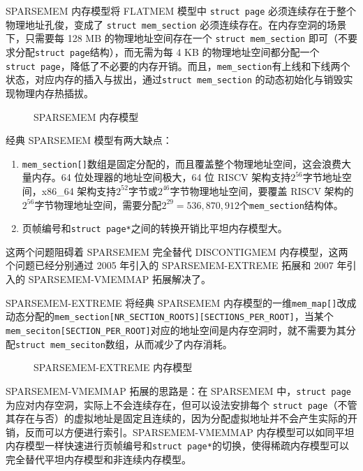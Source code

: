\documentclass[AutoFakeBold]{LZUThesis}
\begin{document}
\begin{sloppypar}
SPARSEMEM 内存模型将 FLATMEM 模型中 \texttt{struct\ page}
必须连续存在于整个物理地址孔俊，变成了 \texttt{struct\ mem\_section}
必须连续存在。在内存空洞的场景下，只需要每 128 MB 的物理地址空间存在一个
\texttt{struct\ mem\_section} 即可（不要求分配\texttt{struct\ page}结构），而无需为每 4 KB 的物理地址空间都分配一个\texttt{struct\ page}，降低了不必要的内存开销。而且，\texttt{mem\_section}有上线和下线两个状态，对应内存的插入与拔出，通过\texttt{struct\ mem\_section} 的动态初始化与销毁实现物理内存热插拔。

\begin{figure}[htb]
\centering

\caption{SPARSEMEM 内存模型}
\end{figure}

经典 SPARSEMEM 模型有两大缺点：

\begin{enumerate}
\def\labelenumi{\arabic{enumi}.}
\item
  \texttt{mem\_section{[}{]}}数组是固定分配的，而且覆盖整个物理地址空间，这会浪费大量内存。64
  位处理器的地址空间极大，64 位 RISCV
  架构支持\(2^{56}\)字节地址空间，x86\_64
  架构支持\(2^{52}\)字节或\(2^{46}\)字节物理地址空间，要覆盖 RISCV
  架构的\(2^{56}\)字节物理地址空间，需要分配\(2^{29} = 536,870,912\)个\texttt{mem\_section}结构体。
\item
  页帧编号和\texttt{struct\ page*}之间的转换开销比平坦内存模型大。
\end{enumerate}

这两个问题阻碍着 SPARSEMEM 完全替代 DISCONTIGMEM
内存模型，这两个问题已经分别通过 2005 年引入的 SPARSEMEM-EXTREME 拓展和
2007 年引入的 SPARSEMEM-VMEMMAP 拓展解决了。

SPARSEMEM-EXTREME 将经典 SPARSEMEM
内存模型的一维\texttt{mem\_map{[}{]}}改成动态分配的\texttt{mem\_section{[}NR\_SECTION\_ROOTS{]}{[}SECTIONS\_PER\_ROOT{]}}，当某个\texttt{mem\_seciton{[}SECTION\_PER\_ROOT{]}}对应的地址空间是内存空洞时，就不需要为其分配\texttt{struct\ mem\_seciton}数组，从而减少了内存消耗。

\begin{figure}[H]
\centering

\caption{SPARSEMEM-EXTREME 内存模型}
\end{figure}

SPARSEMEM-VMEMMAP 拓展的思路是：在 SPARSEMEM 中，\texttt{struct\ page}
为应对内存空洞，实际上不会连续存在，但可以设法安排每个
\texttt{struct\ page}（不管其存在与否）的虚拟地址是固定且连续的，因为分配虚拟地址并不会产生实际的开销，反而可以方便进行索引。SPARSEMEM-VMEMMAP
内存模型可以如同平坦内存模型一样快速进行页帧编号和\texttt{struct\ page*}的切换，使得稀疏内存模型可以完全替代平坦内存模型和非连续内存模型。


\end{sloppypar}
\end{document}
